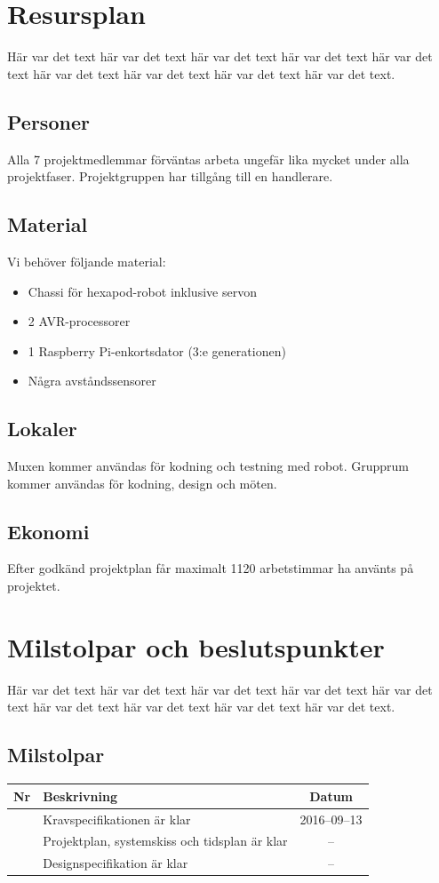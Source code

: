 \documentclass[a4paper,titlepage,12pt]{article}
\newcounter{milNr}
\newcommand{\nextMilNr}{\stepcounter{milNr}\arabic{milNr}}
\begin{document}
	
	\section{Resursplan}
	Här var det text här var det text här var det text
	här var det text här var det text här var det text
	här var det text här var det text här var det text.
	
	
	\subsection{Personer}
    Alla 7 projektmedlemmar förväntas arbeta ungefär lika mycket under alla
    projektfaser. Projektgruppen har tillgång till en handlerare.
	
	\subsection{Material}
	Vi behöver följande material:
    \begin{itemize}
            \item Chassi för hexapod-robot inklusive servon
            \item 2 AVR-processorer
            \item 1 Raspberry Pi-enkortsdator (3:e generationen)
            \item Några avståndssensorer %
    \end{itemize}
	
	
	\subsection{Lokaler}
    Muxen kommer användas för kodning och testning med robot. Grupprum kommer
    användas för kodning, design och möten.
	
	
	\subsection{Ekonomi}
    Efter godkänd projektplan får maximalt 1120 arbetstimmar ha använts på projektet.
	
	
	\section{Milstolpar och beslutspunkter}
	Här var det text här var det text här var det text
	här var det text här var det text här var det text
	här var det text här var det text här var det text.
	
	
	\subsection{Milstolpar}
	\begin{longtable}[c]{ c l c}
		\textbf{Nr} & \textbf{Beskrivning} & \textbf{Datum} \\ \midrule
		\nextMilNr{} & Kravspecifikationen är klar & 2016--09--13 \\ \midrule
		\nextMilNr{} & Projektplan, systemskiss och tidsplan är klar & -- \\ \midrule
		\nextMilNr{} & Designspecifikation är klar & -- \\ \midrule
	\end{longtable}
	
\end{document}
